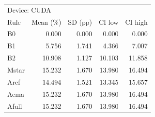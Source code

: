 \begin{tabular}{lrrrr}
\toprule
\multicolumn{5}{l}{Device: CUDA} \\
Rule & Mean (\%) & SD (pp) & CI low & CI high \\
\midrule
B0 & 0.000 & 0.000 & 0.000 & 0.000 \\
B1 & 5.756 & 1.741 & 4.366 & 7.007 \\
B2 & 10.908 & 1.127 & 10.103 & 11.858 \\
Mstar & 15.232 & 1.670 & 13.980 & 16.494 \\
Aref & 14.494 & 1.521 & 13.345 & 15.657 \\
Aema & 15.232 & 1.670 & 13.980 & 16.494 \\
Afull & 15.232 & 1.670 & 13.980 & 16.494 \\
\bottomrule
\end{tabular}
